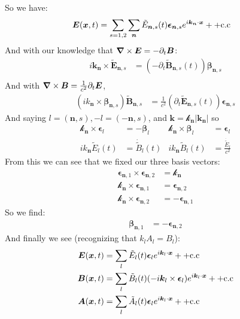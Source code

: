 So we have:
\begin{align*}
	\bm{E}(\bm{x},t) &= \sum_{s=1,2}\sum_{\bm{n}} \tilde{E}_{\bm{n},s}(t) \bm{\epsilon}_{\bm{n},s} e^{i\bm{k}_{\bm{n}}\cdot\bm{x}} + +\text{c.c}
\end{align*}
And with our knowledge that $\bm{\nabla}\times\bm{E} = -\partial_t\bm{B}$:
\begin{align*}
	i\bm{k}_{\bm{n}} \times \tilde{\bm{E}}_{\bm{n},s} &= (-\partial_t \tilde{\bm{B}}_{\bm{n},s}(t)) \bm{\beta}_{\bm{n},s} \\
\end{align*}
And with $\bm{\nabla}\times\bm{B} = \frac{1}{c^2}\partial_t \bm{E}$, 
\begin{align*}
	(ik_{\bm{n}} \times\bm{\beta}_{\bm{n},s})\tilde{\bm{B}}_{\bm{n},s} &= \frac{1}{c^2} (\partial_t \tilde{\bm{E}}_{\bm{n},s}(t))\bm{\epsilon}_{\bm{n},s}
\end{align*}
And saying $l = (\bm{n},s), -l = (-\bm{n},s)$, and $\bm{k} = \bm{\mathcal{k}}_{\bm{n}} |\bm{k}_{\bm{n}}|$ so
\begin{align*}
	\bm{\mathcal{k}}_{\bm{n}} \times\bm{\epsilon}_l &= -\bm{\beta}_l &
	\bm{\mathcal{k}}_{\bm{n}} \times\bm{\beta}_l &= \bm{\epsilon}_l \\
	ik_{\bm{n}} \tilde{E}_l(t) &= \dot{\tilde{B}}_l(t) & 
	ik_{\bm{n}} \tilde{B}_l(t) &= \frac{\dot{\tilde{E}}_l}{c^2}
\end{align*}
From this we can see that we fixed our three basis vectors:
\begin{align*}
	\bm{\epsilon}_{\bm{n},1}\times\bm{\epsilon}_{\bm{n},2} &= \bm{\mathcal{k}}_{\bm{n}} \\
	\bm{\mathcal{k}}_{\bm{n}} \times\bm{\epsilon}_{\bm{n},1} &= \bm{\epsilon}_{\bm{n},2} \\
	\bm{\mathcal{k}}_{\bm{n}} \times\bm{\epsilon}_{\bm{n},2} &= -\bm{\epsilon}_{\bm{n},1}
\end{align*}
So we find:
\begin{align*}
	\bm{\beta}_{\bm{n},1} &= -\bm{\epsilon}_{\bm{n},2}
\end{align*}
And finally we see (recognizing that $k_l A_l = B_l$):
\begin{align*}
	\bm{E}(\bm{x},t) &= \sum_l \tilde{E}_l(t) \bm{\epsilon}_l e^{i\bm{k}_l\cdot\bm{x}} + +\text{c.c} \\
	\bm{B}(\bm{x},t) &= \sum_l \tilde{B}_l(t) (-i\bm{k}_l\times\bm{\epsilon}_l) e^{i\bm{k}_l\cdot\bm{x}} + +\text{c.c} \\
	\bm{A}(\bm{x},t) &= \sum_l \tilde{A}_l(t) \bm{\epsilon}_l e^{i\bm{k}_l\cdot\bm{x}} + +\text{c.c}
\end{align*}

